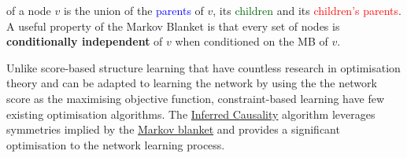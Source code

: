 \begin{frm-def}

\textup{of a node $v$ is the union of the \textcolor{blue}{parents} of $v$, its \textcolor{darkgreen}{children} and its \textcolor{red}{children's parents}. A useful property of the Markov Blanket is that every set of nodes is \textbf{conditionally independent} of $v$ when conditioned on the MB of $v$.}
\end{frm-def}

Unlike score-based structure learning that have countless research in optimisation theory and can be adapted to learning the network by using the the network score as the maximising objective function, constraint-based learning have few existing optimisation algorithms. The \hyperref[icalgo]{Inferred Causality} algorithm leverages symmetries implied by the \hyperref[blanky]{Markov blanket} and provides a significant optimisation to the network learning process.\\

\makeatletter
\def\BState{\State\hskip-\ALG@thistlm}
\makeatother


